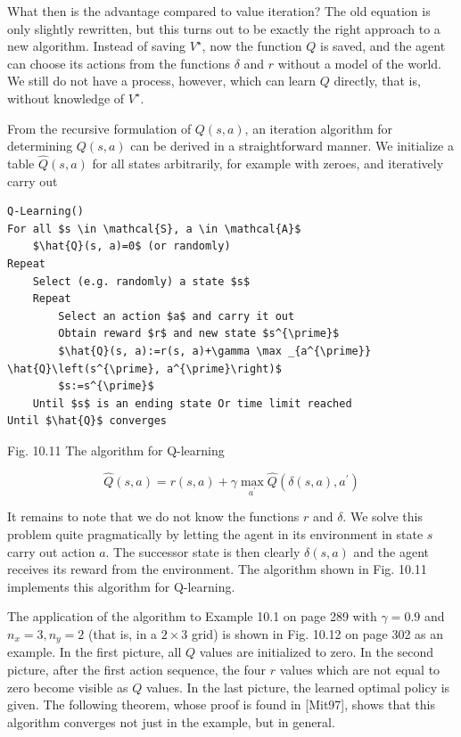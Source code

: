 \documentclass[10pt]{article}
\begin{document}
What then is the advantage compared to value iteration? The old equation is only slightly rewritten, but this turns out to be exactly the right approach to a new algorithm. Instead of saving $V^{\star}$, now the function $Q$ is saved, and the agent can choose its actions from the functions $\delta$ and $r$ without a model of the world. We still do not have a process, however, which can learn $Q$ directly, that is, without knowledge of $V^{\star}$.

From the recursive formulation of $Q(s, a)$, an iteration algorithm for determining $Q(s, a)$ can be derived in a straightforward manner. We initialize a table $\hat{Q}(s, a)$ for all states arbitrarily, for example with zeroes, and iteratively carry out

\begin{verbatim}
Q-Learning()
For all $s \in \mathcal{S}, a \in \mathcal{A}$
    $\hat{Q}(s, a)=0$ (or randomly)
Repeat
    Select (e.g. randomly) a state $s$
    Repeat
        Select an action $a$ and carry it out
        Obtain reward $r$ and new state $s^{\prime}$
        $\hat{Q}(s, a):=r(s, a)+\gamma \max _{a^{\prime}} \hat{Q}\left(s^{\prime}, a^{\prime}\right)$
        $s:=s^{\prime}$
    Until $s$ is an ending state Or time limit reached
Until $\hat{Q}$ converges
\end{verbatim}

Fig. 10.11 The algorithm for Q-learning



\begin{equation*}
\hat{Q}(s, a)=r(s, a)+\gamma \max _{a^{\prime}} \hat{Q}\left(\delta(s, a), a^{\prime}\right) \tag{10.12}
\end{equation*}


It remains to note that we do not know the functions $r$ and $\delta$. We solve this problem quite pragmatically by letting the agent in its environment in state $s$ carry out action $a$. The successor state is then clearly $\delta(s, a)$ and the agent receives its reward from the environment. The algorithm shown in Fig. 10.11 implements this algorithm for Q-learning.

The application of the algorithm to Example 10.1 on page 289 with $\gamma=0.9$ and $n_{x}=3, n_{y}=2$ (that is, in a $2 \times 3$ grid) is shown in Fig. 10.12 on page 302 as an example. In the first picture, all $Q$ values are initialized to zero. In the second picture, after the first action sequence, the four $r$ values which are not equal to zero become visible as $Q$ values. In the last picture, the learned optimal policy is given. The following theorem, whose proof is found in [Mit97], shows that this algorithm converges not just in the example, but in general.
\end{document}
